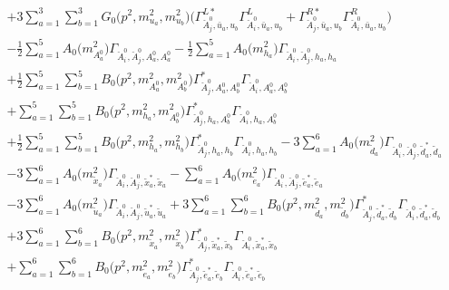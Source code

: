 \begin{itemize}
\begin{align}
 &+3 \sum_{a=1}^{3}\sum_{b=1}^{3}{G_0\Big(p^{2},m^2_{u_{{a}}},m^2_{u_{{b}}}\Big)} \Big({\Gamma^{L*}_{\check{A}^0_{{j}},\bar{u}_{{a}},u_{{b}}}} {\Gamma^L_{\check{A}^0_{{i}},\bar{u}_{{a}},u_{{b}}}}  + {\Gamma^{R*}_{\check{A}^0_{{j}},\bar{u}_{{a}},u_{{b}}}} {\Gamma^R_{\check{A}^0_{{i}},\bar{u}_{{a}},u_{{b}}}} \Big) \nonumber \\ 
 &-\frac{1}{2} \sum_{a=1}^{5}{A_0\Big(m^2_{A^0_{{a}}}\Big)} {\Gamma_{\check{A}^0_{{i}},\check{A}^0_{{j}},A^0_{{a}},A^0_{{a}}}}  -\frac{1}{2} \sum_{a=1}^{5}{A_0\Big(m^2_{h_{{a}}}\Big)} {\Gamma_{\check{A}^0_{{i}},\check{A}^0_{{j}},h_{{a}},h_{{a}}}}  \nonumber \\ 
 &+\frac{1}{2} \sum_{a=1}^{5}\sum_{b=1}^{5}{B_0\Big(p^{2},m^2_{A^0_{{a}}},m^2_{A^0_{{b}}}\Big)} {\Gamma^*_{\check{A}^0_{{j}},A^0_{{a}},A^0_{{b}}}} {\Gamma_{\check{A}^0_{{i}},A^0_{{a}},A^0_{{b}}}}  \nonumber \\ 
 &+\sum_{a=1}^{5}\sum_{b=1}^{5}{B_0\Big(p^{2},m^2_{h_{{a}}},m^2_{A^0_{{b}}}\Big)} {\Gamma^*_{\check{A}^0_{{j}},h_{{a}},A^0_{{b}}}} {\Gamma_{\check{A}^0_{{i}},h_{{a}},A^0_{{b}}}} \nonumber \\ 
 &+\frac{1}{2} \sum_{a=1}^{5}\sum_{b=1}^{5}{B_0\Big(p^{2},m^2_{h_{{a}}},m^2_{h_{{b}}}\Big)} {\Gamma^*_{\check{A}^0_{{j}},h_{{a}},h_{{b}}}} {\Gamma_{\check{A}^0_{{i}},h_{{a}},h_{{b}}}}  -3 \sum_{a=1}^{6}{A_0\Big(m^2_{\tilde{d}_{{a}}}\Big)} {\Gamma_{\check{A}^0_{{i}},\check{A}^0_{{j}},\tilde{d}^*_{{a}},\tilde{d}_{{a}}}}  \nonumber \\ 
 &-3 \sum_{a=1}^{6}{A_0\Big(m^2_{\tilde{x}_{{a}}}\Big)} {\Gamma_{\check{A}^0_{{i}},\check{A}^0_{{j}},\tilde{x}^*_{{a}},\tilde{x}_{{a}}}}  - \sum_{a=1}^{6}{A_0\Big(m^2_{\tilde{e}_{{a}}}\Big)} {\Gamma_{\check{A}^0_{{i}},\check{A}^0_{{j}},\tilde{e}^*_{{a}},\tilde{e}_{{a}}}}  \nonumber \\ 
 &-3 \sum_{a=1}^{6}{A_0\Big(m^2_{\tilde{u}_{{a}}}\Big)} {\Gamma_{\check{A}^0_{{i}},\check{A}^0_{{j}},\tilde{u}^*_{{a}},\tilde{u}_{{a}}}}  +3 \sum_{a=1}^{6}\sum_{b=1}^{6}{B_0\Big(p^{2},m^2_{\tilde{d}_{{a}}},m^2_{\tilde{d}_{{b}}}\Big)} {\Gamma^*_{\check{A}^0_{{j}},\tilde{d}^*_{{a}},\tilde{d}_{{b}}}} {\Gamma_{\check{A}^0_{{i}},\tilde{d}^*_{{a}},\tilde{d}_{{b}}}}  \nonumber \\ 
 &+3 \sum_{a=1}^{6}\sum_{b=1}^{6}{B_0\Big(p^{2},m^2_{\tilde{x}_{{a}}},m^2_{\tilde{x}_{{b}}}\Big)} {\Gamma^*_{\check{A}^0_{{j}},\tilde{x}^*_{{a}},\tilde{x}_{{b}}}} {\Gamma_{\check{A}^0_{{i}},\tilde{x}^*_{{a}},\tilde{x}_{{b}}}}  \nonumber \\ 
 &+\sum_{a=1}^{6}\sum_{b=1}^{6}{B_0\Big(p^{2},m^2_{\tilde{e}_{{a}}},m^2_{\tilde{e}_{{b}}}\Big)} {\Gamma^*_{\check{A}^0_{{j}},\tilde{e}^*_{{a}},\tilde{e}_{{b}}}} {\Gamma_{\check{A}^0_{{i}},\tilde{e}^*_{{a}},\tilde{e}_{{b}}}} \nonumber \\ 

\end{align}
\end{itemize}
